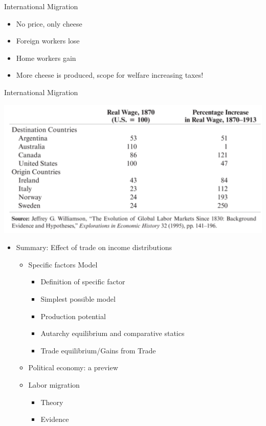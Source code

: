 \documentclass[ignorenonframetext,]{beamer}
\begin{document}
\begin{frame}{International Migration}

    \begin{itemize}
        \item No price, only cheese
        \item Foreign workers lose 
        \item Home workers gain
        \item More cheese is produced, scope for welfare increasing taxes!
    \end{itemize}

\end{frame}

\begin{frame}{International Migration}

    \includegraphics[scale=0.20]{migration_wages.png}

\end{frame}

\begin{frame}
\begin{itemize}
\itemsep1pt\parskip0pt
\item
  Summary: Effect of trade on income distributions
  \begin{itemize}
        \item Specific factors Model
        \begin{itemize}
            \item Definition of specific factor
            \item Simplest possible model
            \item Production potential
            \item Autarchy equilibrium and comparative statics
            \item Trade equilibrium/Gains from Trade
        \end{itemize}
        \item Political economy: a preview
        \item Labor migration
        \begin{itemize}
            \item Theory
            \item Evidence
        \end{itemize}
    \end{itemize}
\end{itemize}

\end{frame}
\end{document}
